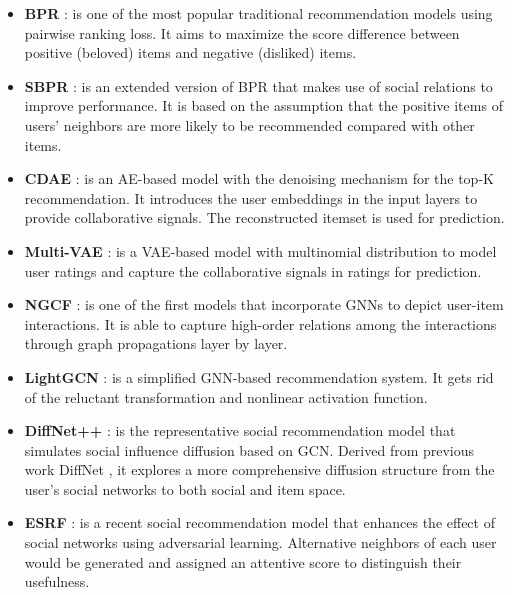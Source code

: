 \documentclass[letterpaper]{article} %
\begin{document}
\begin{itemize}
    \item \textbf{BPR} \cite{bpr}: is one of the most popular traditional recommendation models using pairwise ranking loss. It aims to maximize the score difference between positive (beloved) items and negative (disliked) items.
    \item \textbf{SBPR} \cite{sbpr}: is an extended version of BPR that makes use of social relations to improve performance. It is based on the assumption that the positive items of users' neighbors are more likely to be recommended compared with other items.
    \item \textbf{CDAE} \cite{cdae}: is an AE-based model with the denoising mechanism for the top-K recommendation. It introduces the user embeddings in the input layers to provide collaborative signals. The reconstructed itemset is used for prediction.
    \item \textbf{Multi-VAE} \cite{multivae}: is a VAE-based model with multinomial distribution to model user ratings and capture the collaborative signals in ratings for prediction.
    \item \textbf{NGCF} \cite{ngcf}: is one of the first models that incorporate GNNs to depict user-item interactions. It is able to capture high-order relations among the interactions through graph propagations layer by layer.
    \item \textbf{LightGCN} \cite{lightgcn}: is a simplified GNN-based recommendation system. It gets rid of the reluctant transformation and nonlinear activation function.
    \item \textbf{DiffNet++} \cite{diffnet++}: is the representative social recommendation model that simulates social influence diffusion based on GCN. Derived from previous work DiffNet \cite{diffnet}, it explores a more comprehensive diffusion structure from the user's social networks to both social and item space.
    \item \textbf{ESRF} \cite{ESRF}: is a recent social recommendation model that enhances the effect of social networks using adversarial learning. Alternative neighbors of each user would be generated and assigned an attentive score to distinguish their usefulness.
\end{itemize}
\end{document}
